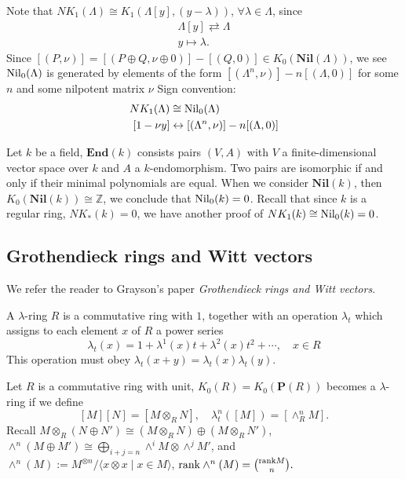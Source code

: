 Note that $NK_1(\Lambda)\cong K_1(\Lambda[y],(y-\lambda))$, $\forall \lambda\in \Lambda$, since 
\begin{gather*}
	\Lambda[y] \rightleftarrows \Lambda\\
y\mapsto \lambda.
\end{gather*}
Since $[(P,\nu)]=[(P\oplus Q,\nu\oplus 0)]-[(Q,0)]\in K_0(\mathbf{Nil}(\Lambda))$, we see $\mathrm{Nil}_0(\Lambda)$ is generated by elements of the form $[(\Lambda^n,\nu)]-n[(\Lambda,0)]$ for some $n$ and some nilpotent matrix $\nu$
Sign convention:
\begin{align*}
	NK_1(\Lambda) & \cong \mathrm{Nil}_0(\Lambda)\\
[1-\nu y] & \leftrightarrow [(\Lambda^n,\nu)]-n[(\Lambda,0)]
\end{align*}
\begin{example}
	Let $k$ be a field, $\mathbf{End}(k)$ consists pairs $(V,A)$ with $V$ a finite-dimensional vector space over $k$ and $A$ a $k$-endomorphism. Two pairs are isomorphic if and only if their minimal polynomials are equal. When we consider $\mathbf{Nil}(k)$, then $K_0(\mathbf{Nil}(k))\cong \mathbb{Z}$, we conclude that $\mathrm{Nil}_0(k)=0$. Recall that since $k$ is a regular ring, $NK_*(k)=0$, we have another proof of $NK_1(k)\cong \mathrm{Nil}_0(k)=0$.
\end{example}


\subsection{Grothendieck rings and Witt vectors}
\label{subsec:grothendieck_rings_and_witt_vectors}
We refer the reader to Grayson's paper {\em Grothendieck rings and Witt vectors}.
\begin{definition}
	A $\lambda$-ring $R$ is a commutative  ring with $1$, together with an operation $\lambda_t$ which assigns to each element $x$ of $R$ a power series
	\[\lambda_t(x)=1+\lambda^1(x)t+\lambda^2(x)t^2+\cdots, \quad x\in R\]
	This operation must obey $\lambda_t(x+y)=\lambda_t(x)\lambda_t(y)$. 
\end{definition}
Let $R$ is a commutative ring with unit, $K_0(R)=K_0(\mathbf{P}(R))$ becomes a $\lambda$-ring if we define 
\[[M][N]=[M\otimes_R N], \quad \lambda_t^n([M])=[\wedge^n_R M]. \]
Recall $M\otimes_R(N\oplus N')\cong (M\otimes_R N)\oplus(M\otimes_R N')$, $\wedge^n(M\oplus M')\cong \bigoplus_{i+j=n}\wedge^i M\otimes \wedge^j M'$, and $\wedge^n(M):=M^{\otimes n}/\langle x\otimes x \mid x\in M\rangle$, $\mathrm{rank} \wedge^n(M)=\binom{\mathrm{rank} M}{n}. $

